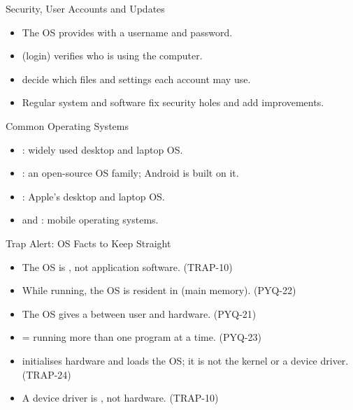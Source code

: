 \documentclass[aspectratio=169]{beamer}
\begin{document}
\begin{frame}{Security, User Accounts and Updates}
  \begin{itemize}
    \item The OS provides  with a username and password.
    \item {} (login) verifies who is using the computer.
    \item {} decide which files and settings each account may
      use.
    \item Regular system and software  fix security holes and add
      improvements.
  \end{itemize}
\end{frame}

\begin{frame}{Common Operating Systems}
  \begin{itemize}
    \item {}: widely used desktop and laptop OS.
    \item {}: an open-source OS family; Android is built on it.
    \item {}: Apple's desktop and laptop OS.
    \item {} and : mobile operating systems.
  \end{itemize}
\end{frame}

\begin{frame}{Trap Alert: OS Facts to Keep Straight}
  \begin{itemize}
    \item The OS is , not application software. (TRAP-10)
    \item While running, the OS is resident in 
      (main memory). (PYQ-22)
    \item The OS gives a  between user and
      hardware. (PYQ-21)
    \item {} = running more than one program at a time.
      (PYQ-23)
    \item {} initialises hardware and loads the OS; it is not the
      kernel or a device driver. (TRAP-24)
    \item A device driver is , not hardware. (TRAP-10)
  \end{itemize}
\end{frame}
\end{document}
